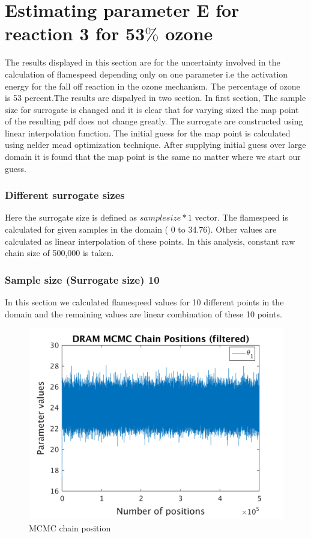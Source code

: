 \section{Estimating parameter E for reaction 3 for 53$\%$ ozone }

The results displayed in this section are for the uncertainty involved in the calculation of flamespeed depending only on one parameter i.e the activation energy for the fall off reaction in the ozone mechanism. The percentage of ozone is 53 percent.The results are dispalyed in two section. In first section, The sample size for surrogate is changed and it is clear that for varying sized the map point of the resulting pdf does not change greatly. The surrogate are constructed using linear interpolation function. The initial guess for the map point is calculated using nelder mead optimization technique. After supplying initial guess over large domain it is found that the map point is the same no matter where we start our guess. 
\bigskip

\subsubsection{Different surrogate sizes }

\noindent Here the surrogate size is defined as $sample size*1$ vector. The flamespeed is calculated for given samples in the domain ( 0 to 34.76). Other values are calculated as linear interpolation of these points. In this analysis, constant raw chain size of 500,000 is taken. 
\subsubsection{Sample size (Surrogate size) 10 }
In this section we calculated flamespeed values for 10 different points in the domain and the remaining values are linear combination of these 10 points.  
\begin{figure}[H]
  
  \centering
   \includegraphics[scale=0.75]{100_results/outputData_10/simple_ip_chain_pos_filt}
   \caption{MCMC chain position }
\end{figure}


